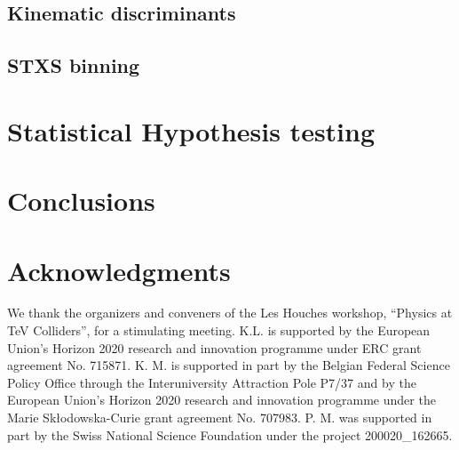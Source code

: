 \documentclass[11pt]{cernrep}
\begin{document}
\subsection{Kinematic discriminants}
\label{sec:training}


\subsection{STXS binning}
\label{sec:stxs}

\section{Statistical Hypothesis testing}
\label{sec:test}



\section{Conclusions}
\label{sec:conclusions}




\section*{Acknowledgments}

We thank the organizers and conveners of the Les Houches workshop, ``Physics
at TeV Colliders'', for a stimulating meeting. K.L. is supported by the European Union's
Horizon 2020 research and innovation programme under ERC grant agreement
No. 715871. K. M. is supported in part by the Belgian Federal Science Policy Office
through the Interuniversity Attraction Pole P7/37 and by the European Union's Horizon 2020
research and innovation programme under the Marie Sk\l{}odowska-Curie grant agreement
No. 707983. 
P. M. was supported in part by the Swiss National Science Foundation under the project
200020\_162665.






%
\end{document}

